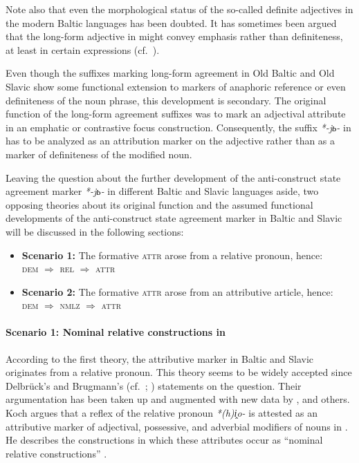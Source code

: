 Note also that even the morphological status of the so-called definite adjectives in the modern Baltic languages has been doubted. It has sometimes been argued that the long-form adjective in  might convey emphasis rather than definiteness, at least in certain expressions (cf.~\citealt[181–182]{kramsky1972}).

Even though the suffixes marking long-form agreement in Old Baltic and Old Slavic show some functional extension to markers of anaphoric reference or even definiteness of the noun phrase, this development is secondary. The original function of the long-form agreement suffixes was to mark an adjectival attribute in an emphatic or contrastive focus construction. Consequently, the suffix \textit{*-jь-} in  has to be analyzed as an attribution marker on the adjective rather than as a marker of definiteness of the modified noun.

Leaving the question about the further development of the anti-construct state agreement marker \textit{*-jь-} in different Baltic and Slavic languages aside, two opposing theories about its original function and the assumed functional developments of the anti-construct state agreement marker in Baltic and Slavic will be discussed in the following sections:
\begin{itemize}
\item \textbf{Scenario 1:} The formative \textsc{attr} arose from a relative pronoun, hence:\\
\textsc{dem $\Rightarrow$ rel $\Rightarrow$ attr}
\item \textbf{Scenario 2:} The formative \textsc{attr} arose from an attributive article, hence:\\
\textsc{dem $\Rightarrow$ nmlz $\Rightarrow$ attr}
\label{2paths}
\end{itemize}

\paragraph{Scenario 1: Nominal relative constructions in }
According to the first theory, the attributive marker in Baltic and Slavic originates from a relative pronoun. This theory seems to be widely accepted since Delbrück's and Brugmann's (cf.~\citealt[432–433]{delbruck1893}; \citealt[331, 344]{brugmann-etal1916}) statements on the question. Their argumentation has been taken up and augmented with new data by \citet{schmidt1959}, \citet{koch1992,koch1999} and others. Koch argues that a reflex of the  relative pronoun \textit{*(h)i̭o-} is attested as an attributive marker of adjectival, possessive, and adverbial modifiers of nouns in . He describes the constructions in which these attributes occur as “nominal relative constructions” \cite[470, elsewhere]{koch1999}.

